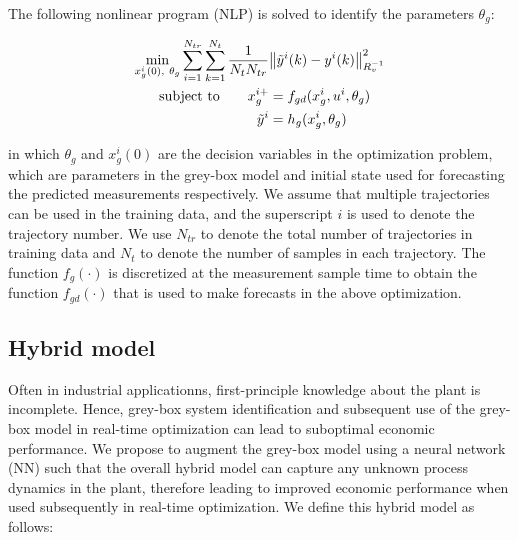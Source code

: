 \documentclass[10pt]{article}
\begin{document}
The following nonlinear program (NLP) is solved to identify the parameters
$\theta_g$:

\begin{align} \label{eq:gb_training}
  \underset{x_g^i(0), \ \theta_g}{\textnormal{min}} \sum_{i=1}^{N_{tr}} \sum_{k=1}^{N_t} 
  \dfrac{1}{N_tN_{tr}} &\norm{\tilde{y}^i(k) - y^i(k)}^2_{R_v^{-1}}  \\
  \textnormal{subject to} \quad \quad x_g^{i+} &= f_{gd}(x_g^i, u^i, \theta_g) \nonumber \\
   \tilde{y}^i &= h_g(x_g^i, \theta_g) \nonumber
\end{align}

in which $\theta_g$ and $x_g^i(0)$ are the decision variables in the
optimization problem, which are parameters in the grey-box model and initial
state used for forecasting the predicted measurements respectively. We assume
that multiple trajectories can be used in the training data, and the superscript
$i$ is used to denote the trajectory number. We use $N_{tr}$ to denote the total
number of trajectories in training data and $N_t$ to denote the number of
samples in each trajectory. The function $f_{g}(\cdot)$ is discretized at the
measurement sample time to obtain the function $f_{gd}(\cdot)$ that is used to
make forecasts in the above optimization.

\subsection{Hybrid model}

Often in industrial applicationns, first-principle knowledge about the plant is
incomplete. Hence, grey-box system identification and subsequent use of the
grey-box model in real-time optimization can lead to suboptimal economic
performance. We propose to augment the grey-box model using a neural network
(NN) such that the overall hybrid model can capture any unknown process dynamics
in the plant, therefore leading to improved economic performance when used
subsequently in real-time optimization. We define this hybrid model as follows:
\end{document}

